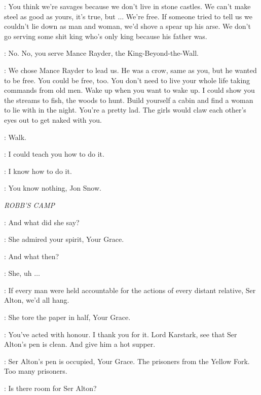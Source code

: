 
\YGRITTE: You think we're savages because we don't live in stone castles. We can't make steel as good as yours, it's true, but $\ldots$ We're free. If someone tried to tell us we couldn't lie down as man and woman, we'd shove a spear up his arse. We don't go serving some shit king who's only king because his father was.

\JON: No. No, you serve Mance Rayder, the King-Beyond-the-Wall.


\YGRITTE: We chose Mance Rayder to lead us. He was a crow, same as you, but he wanted to be free. You could be free, too. You don't need to live your whole life taking commands from old men. Wake up when you want to wake up. I could show you the streams to fish, the woods to hunt. Build yourself a cabin and find a woman to lie with in the night. You're a pretty lad. The girls would claw each other's eyes out to get naked with you.

\JON: Walk.

\YGRITTE: I could teach you how to do it.

\JON: I know how to do it.

\YGRITTE: You know nothing, Jon Snow.



\scene

\textit{ROBB'S CAMP}


\ROBB: And what did she say?

\ALTON: She admired your spirit, Your Grace.

\ROBB: And what then?

\ALTON: She, uh $\ldots$

\ROBB: If every man were held accountable for the actions of every distant relative, Ser Alton, we'd all hang.

\ALTON: She tore the paper in half, Your Grace.

\ROBB: You've acted with honour. I thank you for it. Lord Karstark, see that Ser Alton's pen is clean. And give him a hot supper.

\KARSTARK: Ser Alton's pen is occupied, Your Grace. The prisoners from the Yellow Fork. Too many prisoners.

\ROBB: Is there room for Ser Alton?

